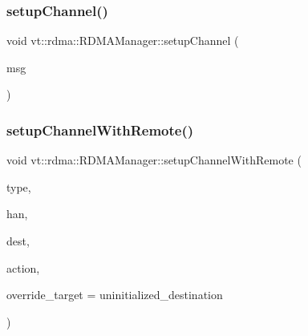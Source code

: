 \mbox{\label{structvt_1_1rdma_1_1_r_d_m_a_manager_a5189682bba9e4b73faa010bf78f96469}} 
\subsubsection{\texorpdfstring{setup\+Channel()}{setupChannel()}}
{\footnotesize\ttfamily void vt\+::rdma\+::\+R\+D\+M\+A\+Manager\+::setup\+Channel (\begin{DoxyParamCaption}\item[{\hyperlink{structvt_1_1rdma_1_1_create_channel}{Create\+Channel} $\ast$}]{msg }\end{DoxyParamCaption})\hspace{0.3cm}{\ttfamily [static]}}

\mbox{\label{structvt_1_1rdma_1_1_r_d_m_a_manager_abd4b573102bf0a4c7dd0687d257f7a0d}} 
\subsubsection{\texorpdfstring{setup\+Channel\+With\+Remote()}{setupChannelWithRemote()}}
{\footnotesize\ttfamily void vt\+::rdma\+::\+R\+D\+M\+A\+Manager\+::setup\+Channel\+With\+Remote (\begin{DoxyParamCaption}\item[{\hyperlink{namespacevt_1_1rdma_ac848e1d9da43db6294bd06f83e5d3946}{R\+D\+M\+A\+\_\+\+Type\+Type} const \&}]{type,  }\item[{\hyperlink{namespacevt_a10442579ec4e7ebef223818e64bcf908}{R\+D\+M\+A\+\_\+\+Handle\+Type} const \&}]{han,  }\item[{\hyperlink{namespacevt_a866da9d0efc19c0a1ce79e9e492f47e2}{Node\+Type} const \&}]{dest,  }\item[{\hyperlink{namespacevt_ae0a5a7b18cc99d7b732cb4d44f46b0f3}{Action\+Type} const \&}]{action,  }\item[{\hyperlink{namespacevt_a866da9d0efc19c0a1ce79e9e492f47e2}{Node\+Type} const \&}]{override\+\_\+target = {\ttfamily uninitialized\+\_\+destination} }\end{DoxyParamCaption})\hspace{0.3cm}{\ttfamily [private]}}

